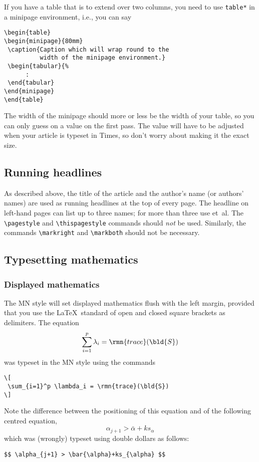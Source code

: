 %
If you have a table that is to extend over two columns, you need to use
\verb"table*" in a minipage environment, i.e., you can say
%
\begin{verbatim}
\begin{table*}
\begin{minipage}{80mm}
 \caption{Caption which will wrap round to the
          width of the minipage environment.}
 \begin{tabular}{%
      :
 \end{tabular}
\end{minipage}
\end{table*}
\end{verbatim}
%
The width of the minipage should more or less be the width of your table,
so you can only guess on a value on the first pass. The value will have to 
be adjusted when your article is typeset in Times, so don't worry about
making it the exact size.

\subsection{Running headlines}

As described above, the title of the article and the author's name (or
authors' names) are used as running headlines at the top of every page.
The headline on left-hand pages can list up to three names; for more than
three use et~al. The \verb"\pagestyle" and \verb"\thispagestyle"
commands should {\em not\/} be used. Similarly, the commands
\verb"\markright" and \verb"\markboth" should not be necessary.


\subsection[]{Typesetting mathematics}\label{TMth}

\subsubsection{Displayed mathematics}

The MN style will set displayed mathematics flush with the left margin,
provided that you use the \LaTeX\ standard of open and closed square
brackets as delimiters. The equation
\[
 \sum_{i=1}^p \lambda_i = \rmn{trace}(\bld{S})
\]
was typeset in the MN style using the commands
%
\begin{verbatim}
\[
 \sum_{i=1}^p \lambda_i = \rmn{trace}(\bld{S})
\]
\end{verbatim}
%
Note the difference between the positioning of this equation and of
the following centred equation,
$$ \alpha_{j+1} > \bar{\alpha}+ks_{\alpha} $$
which was (wrongly) typeset using double dollars as follows:
%
\begin{verbatim}
$$ \alpha_{j+1} > \bar{\alpha}+ks_{\alpha} $$
\end{verbatim}


